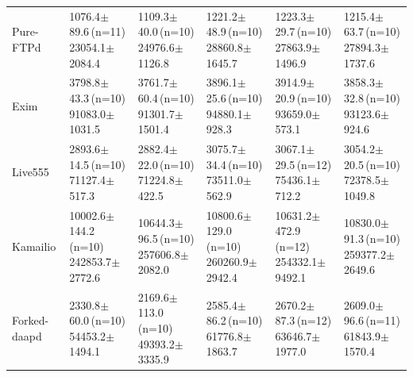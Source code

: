 \documentclass[final,5p,times,number]{elsarticle}
\begin{document}
\begin{table}[!tbp]
\begin{tabularx}{\textwidth}{l *{5}{>{\centering\arraybackslash}X}}
\addlinespace[3pt]
Pure-FTPd & \shortstack{1076.4$\pm$89.6\,(n=11)\\23054.1$\pm$2084.4} & \shortstack{1109.3$\pm$40.0\,(n=10)\\24976.6$\pm$1126.8} & \shortstack{1221.2$\pm$48.9\,(n=10)\\28860.8$\pm$1645.7} & \shortstack{1223.3$\pm$29.7\,(n=10)\\27863.9$\pm$1496.9} & \shortstack{1215.4$\pm$63.7\,(n=10)\\27894.3$\pm$1737.6} \\
\addlinespace[3pt]
Exim & \shortstack{3798.8$\pm$43.3\,(n=10)\\91083.0$\pm$1031.5} & \shortstack{3761.7$\pm$60.4\,(n=10)\\91301.7$\pm$1501.4} & \shortstack{3896.1$\pm$25.6\,(n=10)\\94880.1$\pm$928.3} & \shortstack{3914.9$\pm$20.9\,(n=10)\\93659.0$\pm$573.1} & \shortstack{3858.3$\pm$32.8\,(n=10)\\93123.6$\pm$924.6} \\
\addlinespace[3pt]
Live555 & \shortstack{2893.6$\pm$14.5\,(n=10)\\71127.4$\pm$517.3} & \shortstack{2882.4$\pm$22.0\,(n=10)\\71224.8$\pm$422.5} & \shortstack{3075.7$\pm$34.4\,(n=10)\\73511.0$\pm$562.9} & \shortstack{3067.1$\pm$29.5\,(n=12)\\75436.1$\pm$712.2} & \shortstack{3054.2$\pm$20.5\,(n=10)\\72378.5$\pm$1049.8} \\
\addlinespace[3pt]
Kamailio & \shortstack{10002.6$\pm$144.2\,(n=10)\\242853.7$\pm$2772.6} & \shortstack{10644.3$\pm$96.5\,(n=10)\\257606.8$\pm$2082.0} & \shortstack{10800.6$\pm$129.0\,(n=10)\\260260.9$\pm$2942.4} & \shortstack{10631.2$\pm$472.9\,(n=12)\\254332.1$\pm$9492.1} & \shortstack{10830.0$\pm$91.3\,(n=10)\\259377.2$\pm$2649.6} \\
\addlinespace[3pt]
Forked-daapd & \shortstack{2330.8$\pm$60.0\,(n=10)\\54453.2$\pm$1494.1} & \shortstack{2169.6$\pm$113.0\,(n=10)\\49393.2$\pm$3335.9} & \shortstack{2585.4$\pm$86.2\,(n=10)\\61776.8$\pm$1863.7} & \shortstack{2670.2$\pm$87.3\,(n=12)\\63646.7$\pm$1977.0} & \shortstack{2609.0$\pm$96.6\,(n=11)\\61843.9$\pm$1570.4} \\

\end{tabularx}
\end{table}
\end{document}
